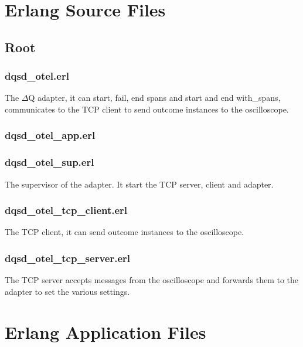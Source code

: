 \chapter{Erlang Source Files}

\section{Root}

\subsection{dqsd\_otel.erl}
The $\Delta$Q adapter, it can start, fail, end spans and start and end with\_spans, communicates to the TCP client to send outcome instances to the oscilloscope.


\subsection{dqsd\_otel\_app.erl}


\subsection{dqsd\_otel\_sup.erl}
The supervisor of the adapter. It start the TCP server, client and adapter.


\subsection{dqsd\_otel\_tcp\_client.erl}
The TCP client, it can send outcome instances to the oscilloscope.


\subsection{dqsd\_otel\_tcp\_server.erl}
The TCP server accepts messages from the oscilloscope and forwards them to the adapter to set the various settings.


\chapter{Erlang Application Files}

